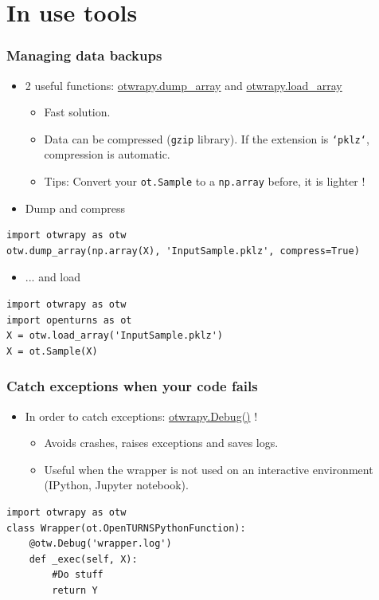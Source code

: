 \documentclass[10pt, aspectratio=169]{beamer}
\begin{document}
\section{In use tools}
\label{sec-4}
\begin{frame}[fragile]
\frametitle{Managing data backups}
\begin{itemize}
\item 2 useful functions:  \href{http://openturns.github.io/otwrapy/master/_generated/otwrapy.dump_array.html}{otwrapy.dump\_array} and  \href{http://openturns.github.io/otwrapy/master/_generated/otwrapy.load_array.html}{otwrapy.load\_array}
\begin{itemize}
	\item Fast solution.
	\item Data can be compressed (\texttt{gzip} library). If the extension is \texttt{`pklz`}, compression is automatic.
	\item Tips: Convert your \texttt{ot.Sample} to a \texttt{np.array} before, it is lighter !
\end{itemize}

\item Dump and compress
\end{itemize}
\begin{Verbatim}[xleftmargin=10mm]
import otwrapy as otw
otw.dump_array(np.array(X), 'InputSample.pklz', compress=True)
\end{Verbatim}

\begin{itemize}
\item ... and load
\end{itemize}
\begin{Verbatim}[xleftmargin=10mm]
import otwrapy as otw
import openturns as ot
X = otw.load_array('InputSample.pklz')
X = ot.Sample(X)
\end{Verbatim}
\end{frame}

\begin{frame}[fragile]
\frametitle{Catch exceptions when your code fails}
\begin{itemize}
\item In order to catch exceptions: \href{http://openturns.github.io/otwrapy/master/_generated/otwrapy.Debug.html}{otwrapy.Debug()} !
\begin{itemize}
\item Avoids crashes, raises exceptions and saves logs.
\item Useful when the wrapper is not used on an interactive environment (IPython, Jupyter notebook).
\end{itemize}

\end{itemize}
\begin{Verbatim}[xleftmargin=10mm]
import otwrapy as otw
class Wrapper(ot.OpenTURNSPythonFunction):
    @otw.Debug('wrapper.log')
    def _exec(self, X):
        #Do stuff
        return Y
\end{Verbatim}
\end{frame}
\end{document}
